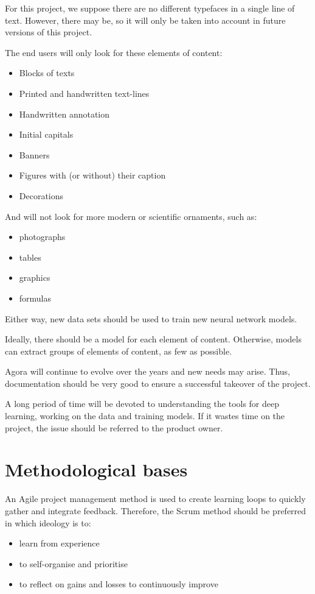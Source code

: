 \documentclass{polytech/polytech}
\numberwithin{figure}{chapter}
\begin{document}
For this project, we suppose there are no different typefaces in a single line of text.
However, there may be, so it will only be taken into account in future versions of this project.

The end users will only look for these elements of content:
\begin{itemize}
\item Blocks of texts
\item Printed and handwritten text-lines
\item Handwritten annotation
\item Initial capitals
\item Banners
\item Figures with (or without) their caption
\item Decorations
\end{itemize}

And will not look for more modern or scientific ornaments, such as:
\begin{itemize}
\item photographs
\item tables
\item graphics
\item formulas
\end{itemize}
Either way, new data sets should be used to train new neural network models.

Ideally, there should be a model for each element of content.
Otherwise, models can extract groups of elements of content, as few as possible.

Agora will continue to evolve over the years and new needs may arise.
Thus, documentation should be very good to ensure a successful takeover of the project.

A long period of time will be devoted to understanding the tools for deep learning, working on the data and training models.
If it wastes time on the project, the issue should be referred to the product owner.


\section{Methodological bases}

An Agile project management method is used to create learning loops to quickly gather and integrate feedback.
Therefore, the Scrum method should be preferred in which ideology is to:
\begin{itemize}
\item learn from experience
\item to self-organise and prioritise
\item to reflect on gains and losses to continuously improve
\end{itemize}
\end{document}
